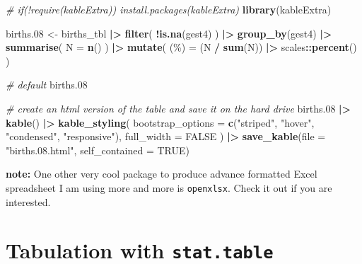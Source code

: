 \documentclass[
]{book}
\newenvironment{Shaded}{\begin{snugshade}}{\end{snugshade}}
\newcommand{\AttributeTok}[1]{\textcolor[rgb]{0.13,0.29,0.53}{#1}}
\newcommand{\CommentTok}[1]{\textcolor[rgb]{0.56,0.35,0.01}{\textit{#1}}}
\newcommand{\ConstantTok}[1]{\textcolor[rgb]{0.56,0.35,0.01}{#1}}
\newcommand{\FloatTok}[1]{\textcolor[rgb]{0.00,0.00,0.81}{#1}}
\newcommand{\FunctionTok}[1]{\textcolor[rgb]{0.13,0.29,0.53}{\textbf{#1}}}
\newcommand{\NormalTok}[1]{#1}
\newcommand{\OtherTok}[1]{\textcolor[rgb]{0.56,0.35,0.01}{#1}}
\newcommand{\SpecialCharTok}[1]{\textcolor[rgb]{0.81,0.36,0.00}{\textbf{#1}}}
\newcommand{\StringTok}[1]{\textcolor[rgb]{0.31,0.60,0.02}{#1}}
\begin{document}
\begin{Shaded}
\begin{Highlighting}[]
\CommentTok{\# if(!require(kableExtra)) install.packages(\textquotesingle{}kableExtra\textquotesingle{})}
\FunctionTok{library}\NormalTok{(kableExtra)}

\NormalTok{births}\FloatTok{.08} \OtherTok{\textless{}{-}}
\NormalTok{  births\_tbl }\SpecialCharTok{|\textgreater{}}
  \FunctionTok{filter}\NormalTok{(}
    \SpecialCharTok{!}\FunctionTok{is.na}\NormalTok{(gest4)}
\NormalTok{  ) }\SpecialCharTok{|\textgreater{}}
  \FunctionTok{group\_by}\NormalTok{(gest4) }\SpecialCharTok{|\textgreater{}}
  \FunctionTok{summarise}\NormalTok{(}
    \AttributeTok{N =} \FunctionTok{n}\NormalTok{()}
\NormalTok{  ) }\SpecialCharTok{|\textgreater{}}
  \FunctionTok{mutate}\NormalTok{(}
    \StringTok{\textasciigrave{}}\AttributeTok{(\%)}\StringTok{\textasciigrave{}} \OtherTok{=}\NormalTok{ (N }\SpecialCharTok{/} \FunctionTok{sum}\NormalTok{(N)) }\SpecialCharTok{|\textgreater{}}\NormalTok{ scales}\SpecialCharTok{::}\FunctionTok{percent}\NormalTok{()}
\NormalTok{  )}

\CommentTok{\# default}
\NormalTok{births}\FloatTok{.08}

\CommentTok{\# create an html version of the table and save it on the hard drive}
\NormalTok{births}\FloatTok{.08} \SpecialCharTok{|\textgreater{}}
  \FunctionTok{kable}\NormalTok{() }\SpecialCharTok{|\textgreater{}}
  \FunctionTok{kable\_styling}\NormalTok{(}
    \AttributeTok{bootstrap\_options =} 
      \FunctionTok{c}\NormalTok{(}\StringTok{"striped"}\NormalTok{, }\StringTok{"hover"}\NormalTok{, }\StringTok{"condensed"}\NormalTok{, }\StringTok{"responsive"}\NormalTok{),}
    \AttributeTok{full\_width =} \ConstantTok{FALSE}
\NormalTok{  ) }\SpecialCharTok{|\textgreater{}}
  \FunctionTok{save\_kable}\NormalTok{(}\AttributeTok{file =} \StringTok{"births.08.html"}\NormalTok{, }\AttributeTok{self\_contained =} \ConstantTok{TRUE}\NormalTok{)}
\end{Highlighting}
\end{Shaded}

\textbf{note:} One other very cool package to produce advance formatted Excel spreadsheet I am using more and more is \texttt{openxlsx}. Check it out if you are interested.

\chapter{\texorpdfstring{Tabulation with \texttt{stat.table}}{Tabulation with stat.table}}\label{tabulation-with-stat.table}
\end{document}
